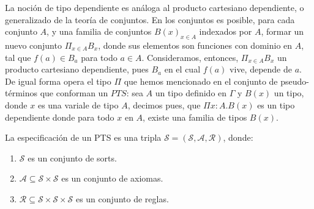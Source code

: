     La noción de tipo dependiente es análoga al producto cartesiano dependiente, o generalizado de la teoría de conjuntos. En los conjuntos es posible, para cada conjunto $A$, y una familia de conjuntos $B(x)_{x\in A}$ indexados por $A$, formar un nuevo conjunto $\Pi _{x\in A} B_x$, donde sus elementos son funciones con dominio en $A$, tal que $f(a) \in B_a$ para todo $a \in A$. Consideramos, entonces, $\Pi _{x\in A} B_x$ un producto cartesiano dependiente, pues $B_a$ en el cual $f(a)$ vive, depende de $a$. De igual forma opera el tipo $\Pi$ que hemos mencionado en el conjunto de pseudo-términos que conforman un $PTS$: sea $A$ un tipo definido en $\Gamma$ y $B(x)$ un tipo, donde $x$ es una variale de tipo $A$, decimos pues, que $\Pi x : A . B(x)$ es un tipo dependiente donde para todo $x$ en $A$, existe una familia de tipos $B(x)$.

    \begin{definition} La especificación de un PTS es una tripla $\mathcal{S} = (\mathcal{S}, \mathcal{A} , \mathcal{R})$, donde:
      \begin{enumerate}
        \item $\mathcal{S}$ es un conjunto de sorts.
        \item $\mathcal{A} \subseteq \mathcal{S} \times \mathcal{S}$ es un conjunto de axiomas.
        \item $\mathcal{R} \subseteq \mathcal{S} \times \mathcal{S}\times \mathcal{S}$ es un conjunto de reglas.
      \end{enumerate}
    \end{definition}

